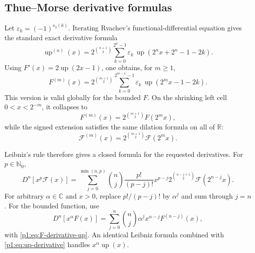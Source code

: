 \documentclass[11pt,oneside]{article}
\theoremstyle{definition}
\theoremstyle{remark}
\newcommand{\Fs}{\mathcal F}
\newcommand{\Up}{\operatorname{up}}
\newcommand{\R}{\mathbb R}
\newcommand{\C}{\mathbb C}
\newcommand{\N}{\mathbb N}
\newcommand{\fall}[2]{#1^{\underline{#2}}}
\newcommand{\eps}{\varepsilon}
\newcommand{\1}{\mathbf 1}
\begin{document}
\subsection{Thue--Morse derivative formulas}
Let \(\eps_k=(-1)^{s_2(k)}\).  Iterating Rvachev's functional-differential
equation gives the standard exact derivative formula
\begin{equation}
 \boxed{\quad
 \Up^{(n)}(x)=2^{\binom{n+1}{2}}
 \sum_{k=0}^{2^n-1}\eps_k\,
 \Up(2^nx+2^n-1-2k).
 \quad}                                                        \label{p1:eq:up-derivative}
\end{equation}
Using \(F'(x)=2\Up(2x-1)\), one obtains, for \(m\geq1\),
\begin{equation}
 \boxed{\quad
 F^{(m)}(x)=2^{\binom{m+1}{2}}
 \sum_{k=0}^{2^{m-1}-1}\eps_k\,
 \Up(2^mx-1-2k).
 \quad}                                                        \label{p1:eq:F-derivative-up}
\end{equation}
This version is valid globally for the bounded \(F\).  On the shrinking left
cell \(0<x<2^{-m}\), it collapses to
\begin{equation}
 F^{(m)}(x)=2^{\binom{m+1}{2}}F(2^mx),                          \label{p1:eq:F-left-higher}
\end{equation}
while the signed extension satisfies the same dilation formula on all of
\(\R\):
\begin{equation}
 \Fs^{(m)}(x)=2^{\binom{m+1}{2}}\Fs(2^mx).                     \label{p1:eq:Fs-higher}
\end{equation}

Leibniz's rule therefore gives a closed formula for the requested derivatives.
For \(p\in\N_0\),
\begin{equation}
 D^n[x^p\Fs(x)]
 =\sum_{j=0}^{\min(n,p)}\binom nj\frac{p!}{(p-j)!}x^{p-j}
 2^{\binom{n-j+1}{2}}\Fs(2^{n-j}x).                            \label{p1:eq:derivative-signed-p}
\end{equation}
For arbitrary \(\alpha\in\C\) and \(x>0\), replace
\(p!/(p-j)!\) by \(\fall\alpha j\) and sum through \(j=n\).
For the bounded function, use
\begin{equation}
 D^n[x^\alpha F(x)]
 =\sum_{j=0}^{n}\binom nj\fall\alpha j x^{\alpha-j}F^{(n-j)}(x),
                                                                    \label{p1:eq:derivative-bounded-alpha}
\end{equation}
with \eqref{p1:eq:F-derivative-up}.  An identical Leibniz formula combined with
\eqref{p1:eq:up-derivative} handles \(x^\alpha\Up(x)\).
\end{document}
